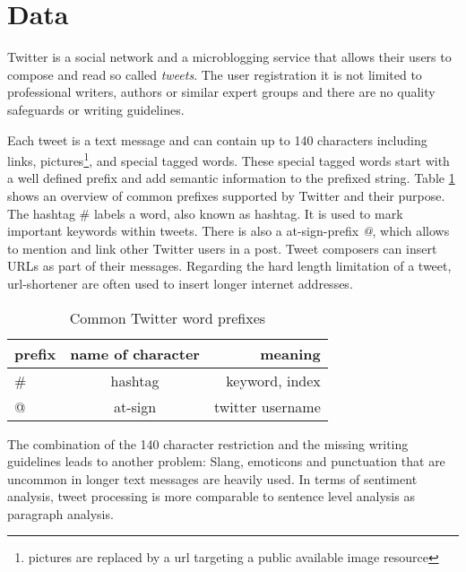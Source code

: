 \section{Data}
Twitter is a social network and a microblogging service that
allows their users to compose and read so called 
\emph{tweets}. The user registration it is not limited 
to professional writers, authors or similar expert groups 
and there are no quality safeguards or writing guidelines. 

Each tweet is a text message and can contain up to 140 characters
including links, pictures\footnote{pictures are replaced 
by a url targeting a public available image resource}, and special tagged words.
These special tagged words start with a well defined prefix 
and add semantic information to the prefixed string.
Table \ref{tab:twitterprefixes} shows an overview of 
common prefixes supported by Twitter and their purpose. 
The hashtag \# labels a word, also known as hashtag. 
It is used to mark important keywords within tweets.
There is also a at-sign-prefix \emph{@}, which allows 
to mention and link other Twitter users in a post. Tweet composers can 
insert URLs as part of their messages. Regarding the hard 
length limitation of a tweet, url-shortener are often used to
insert longer internet addresses.

\begin{table}[H]
\centering
\begin{tabular}{ l | c | r }                 
  prefix & name of character & meaning  \\
  \hline
  \# &  hashtag & keyword, index \\
  @ & at-sign & twitter username \\
  \hline
\end{tabular}
\caption{Common Twitter word prefixes}
\label{tab:twitterprefixes}
\end{table}

The combination of the 140 character restriction and
the missing writing guidelines leads to another problem: 
Slang, emoticons and punctuation that are uncommon in longer 
text messages are heavily used.\autocite{davies2011}
In terms of sentiment analysis, tweet processing is more comparable to
sentence level analysis as paragraph analysis. 

